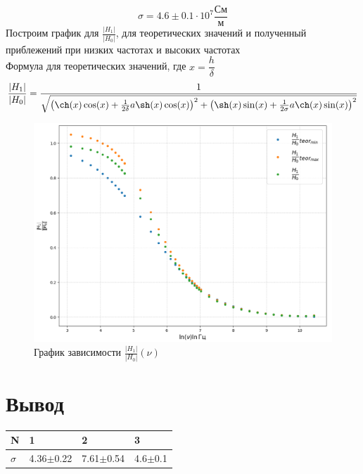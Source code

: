 \documentclass[a4paper,12pt]{article}
\begin{document}
 $$
 \sigma = 4.6 \pm 0.1 \cdot 10^7 \dfrac{\text{См}}{\text{м}}
 $$
 Построим график для $\frac{|H_1|}{|H_0|}$, для теоретических значений и полученный приблежений при низких частотах и высоких частотах\\
 
 Формула для теоретических значений, где $x = \dfrac{h}{\delta}$
 \begin{equation}
    \frac{|H_1|}{|H_0|} = \dfrac{1}{\sqrt{ \left( \ch(x) \cos(x) + \frac{1}{2\delta} a \sh(x) \cos(x) \right)^2 + \left( \sh(x) \sin(x) + \frac{1}{2\sigma} a \ch(x) \sin(x) \right)^2  }}
 \end{equation}

 \begin{figure}[H]
    \centering
    \includegraphics[width=1\textwidth]{7_grf}
    \caption{График зависимости  $\frac{|H_1|}{|H_0|}(\nu)$}
    \label{1.7}
 \end{figure}
 
 \section{Вывод}
 \begin{table}[!ht]
    \centering
    \begin{tabular}{|l|l|l|l|}
        \hline
        N & 1 & 2 & 3 \\ \hline
        $\sigma $ & 4.36$\pm$0.22 & 7.61$\pm$0.54 & 4.6$\pm$0.1 \\ \hline
    \end{tabular}
 \end{table}
\end{document}
